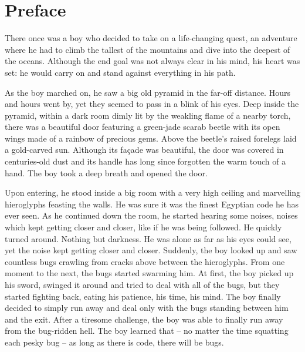\chapter*{Preface}

There once was a boy who decided to take on a life-changing quest, an adventure where he had to climb the tallest of the mountains and dive into the deepest of the oceans. Although the end goal was not always clear in his mind, his heart was set: he would carry on and stand against everything in his path.

As the boy marched on, he saw a big old pyramid in the far-off distance. Hours and hours went by, yet they seemed to pass in a blink of his eyes. Deep inside the pyramid, within a dark room dimly lit by the weakling flame of a nearby torch, there was a beautiful door featuring a green-jade scarab beetle with its open wings made of a rainbow of precious gems. Above the beetle's raised forelegs laid a gold-carved sun. Although its façade was beautiful, the door was covered in centuries-old dust and its handle has long since forgotten the warm touch of a hand. The boy took a deep breath and opened the door.

Upon entering, he stood inside a big room with a very high ceiling and marvelling hieroglyphs feasting the walls. He was sure it was the finest Egyptian code he has ever seen. As he continued down the room, he started hearing some noises, noises which kept getting closer and closer, like if he was being followed. He quickly turned around. Nothing but darkness. He was alone as far as his eyes could see, yet the noise kept getting closer and closer. Suddenly, the boy looked up and saw countless bugs crawling from cracks above between the hieroglyphs. From one moment to the next, the bugs started swarming him. At first, the boy picked up his sword, swinged it around and tried to deal with all of the bugs, but they started fighting back, eating his patience, his time, his mind. The boy finally decided to simply run away and deal only with the bugs standing between him and the exit. After a tiresome challenge, the boy was able to finally run away from the bug-ridden hell. The boy learned that -- no matter the time squatting each pesky bug -- as long as there is code, there will be bugs.


